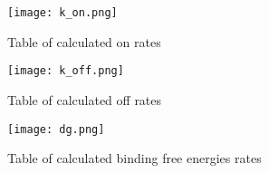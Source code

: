 
\begin{figure}
    \texttt{[image: k\_on.png]}
    \caption{Table of calculated on rates}
    \label{fig:k_on}
\end{figure}

\begin{figure}
    \texttt{[image: k\_off.png]}
    \caption{Table of calculated off rates}
    \label{fig:k_off}
\end{figure}

\begin{figure}
    \texttt{[image: dg.png]}
    \caption{Table of calculated binding free energies rates}
    \label{fig:dfg}
\end{figure}